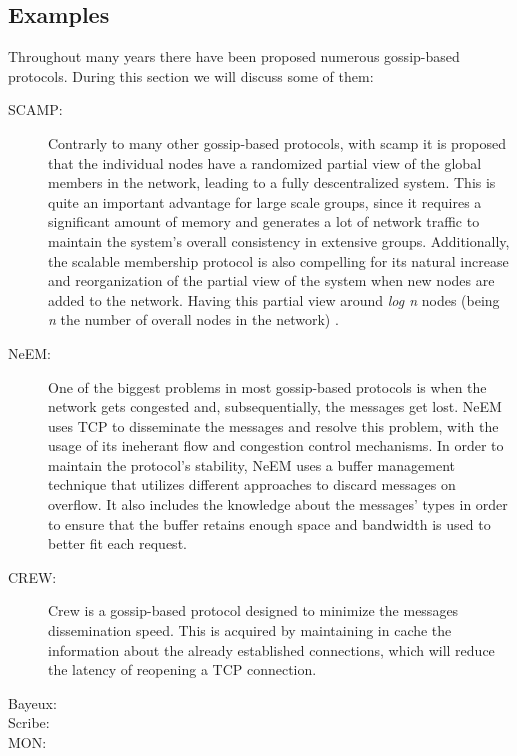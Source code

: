 \subsection{Examples}
Throughout many years there have been proposed numerous gossip-based protocols. During this
section we will discuss some of them:
\begin{description}
    \item[\Gls{SCAMP}:] Contrarly to many other gossip-based protocols, with scamp it is
        proposed that the individual nodes have a randomized partial view of the global
        members in the network, leading to a fully descentralized system. This is quite an
        important advantage for large scale groups, since it requires a significant amount
        of memory and generates a lot of network traffic to maintain the system's overall
        consistency in extensive groups. Additionally, the scalable membership protocol is
        also compelling for its natural increase and reorganization of the partial view of
        the system when new nodes are added to the network. Having this partial view around
        \textit{log n} nodes (being \textit{n} the number of overall nodes in the network)
        \cite{Ganesh2001}.
    \item[\Gls{NeEM}:] One of the biggest problems in most gossip-based protocols is when the
        network gets congested and, subsequentially, the messages get lost. NeEM uses \Gls{TCP}
        to disseminate the messages and resolve this problem, with the usage of its ineherant
        flow and congestion control mechanisms. In order to maintain the protocol's stability,
        NeEM uses a buffer management technique that utilizes different approaches to discard
        messages on overflow. It also includes the knowledge about the messages' types in order
        to ensure that the buffer retains enough space and bandwidth is used to better fit each
        request\cite{Pereira2003}.
    \item[\Gls{CREW}:] Crew is a gossip-based protocol designed to minimize the messages
        dissemination speed. This is acquired by maintaining in cache the information about
        the already established connections, which will reduce the latency of reopening a
        TCP connection\cite{Deshpande2006}.
    \item[Bayeux:]
    \item[Scribe:]
    \item[\Gls{MON}:]
\end{description}


